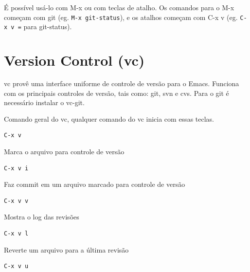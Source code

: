 \documentclass[12pt,brazil]{book}
\begin{document}
É possível usá-lo com M-x ou com teclas de atalho. Os comandos para o
M-x começam com git (eg. \texttt{M-x git-status}), e os atalhos
começam com C-x v (eg. \texttt{C-x v =} para git-status).

\section{Version Control (vc)}
\label{sec:vc}

vc provê uma interface uniforme de controle de versão para o Emacs. Funciona
com os principais controles de versão, tais como: git, svn e cvs. Para o
git é necessário instalar o vc-git.

Comando geral do vc, qualquer comando do vc inicia com essas teclas.
\begin{verbatim}                                                   
C-x v 
\end{verbatim}

Marca o arquivo para controle de versão
\begin{verbatim}                                                                                                
C-x v i                                                                                                
\end{verbatim}

Faz commit em um arquivo marcado para controle de versão
\begin{verbatim}                                                                                                 
C-x v v                                                                                                          
\end{verbatim}

Mostra o log das revisões
\begin{verbatim}                                                                                                
C-x v l                                                                                                       
\end{verbatim}

Reverte um arquivo para a última revisão                                             
\begin{verbatim}                                                                                                 
C-x v u                                                                                                          
\end{verbatim}
\end{document}
